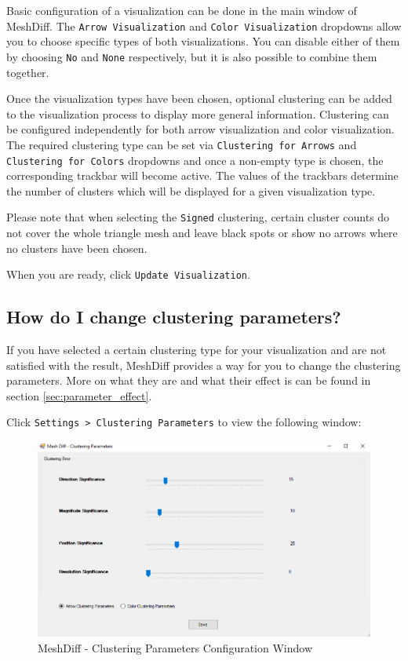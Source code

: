 Basic configuration of a visualization can be done in the main window of MeshDiff. The \verb+Arrow Visualization+ and \verb+Color Visualization+ dropdowns allow you to choose specific types of both visualizations. You can disable either of them by choosing \verb+No+ and \verb+None+ respectively, but it is also possible to combine them together.

Once the visualization types have been chosen, optional clustering can be added to the visualization process to display more general information. Clustering can be configured independently for both arrow visualization and color visualization. The required clustering type can be set via \verb+Clustering for Arrows+ and \verb+Clustering for Colors+ dropdowns and once a non-empty type is chosen, the corresponding trackbar will become active. The values of the trackbars determine the number of clusters which will be displayed for a given visualization type.

Please note that when selecting the \verb+Signed+ clustering, certain cluster counts do not cover the whole triangle mesh and leave black spots or show no arrows where no clusters have been chosen.

When you are ready, click \verb+Update Visualization+.

\subsection{How do I change clustering parameters?}

If you have selected a certain clustering type for your visualization and are not satisfied with the result, MeshDiff provides a way for you to change the clustering parameters. More on what they are and what their effect is can be found in section \ref{sec:parameter_effect}.

Click \verb+Settings > Clustering Parameters+ to view the following window:

\begin{figure}[h]
\centering
\includegraphics[width=1\textwidth]{./img/meshdiff-clustering_parameters.PNG}
\caption[MeshDiff - Clustering Parameters]{MeshDiff - Clustering Parameters Configuration Window}
\label{fig:meshdiff_clustering_parameters}
\end{figure}

